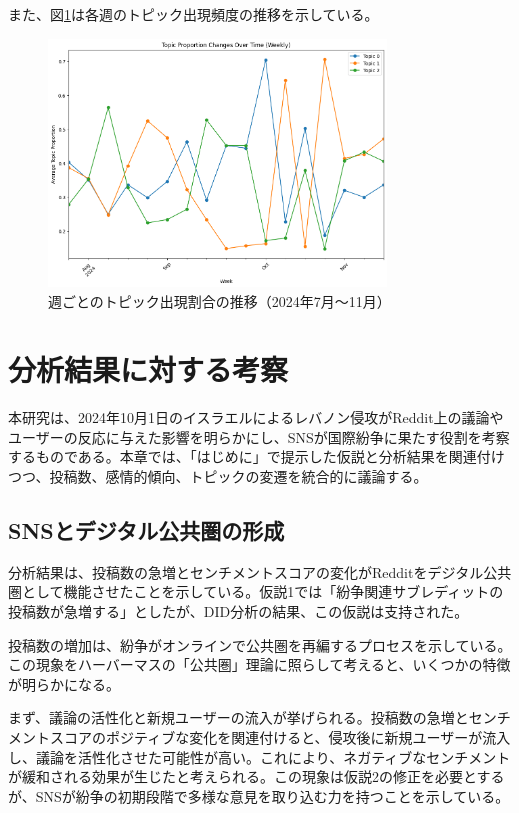 \documentclass[11pt, a4j]{jreport}
\begin{document}
    また、図\ref{fig:topic_trends}は各週のトピック出現頻度の推移を示している。

    \begin{figure}[H]
        \centering
        \includegraphics[width=0.8\textwidth]{topic_trends_plot.png}
        \caption{週ごとのトピック出現割合の推移（2024年7月～11月）}
        \label{fig:topic_trends}
    \end{figure}

    \chapter{分析結果に対する考察}

    本研究は、2024年10月1日のイスラエルによるレバノン侵攻がReddit上の議論やユーザーの反応に与えた影響を明らかにし、SNSが国際紛争に果たす役割を考察するものである。本章では、「はじめに」で提示した仮説と分析結果を関連付けつつ、投稿数、感情的傾向、トピックの変遷を統合的に議論する。

    \section{SNSとデジタル公共圏の形成}
    分析結果は、投稿数の急増とセンチメントスコアの変化がRedditをデジタル公共圏として機能させたことを示している。仮説1では「紛争関連サブレディットの投稿数が急増する」としたが、DID分析の結果、この仮説は支持された。

    投稿数の増加は、紛争がオンラインで公共圏を再編するプロセスを示している。この現象をハーバーマスの「公共圏」理論\citep{habermas1991structural}に照らして考えると、いくつかの特徴が明らかになる。

    まず、議論の活性化と新規ユーザーの流入が挙げられる。投稿数の急増とセンチメントスコアのポジティブな変化を関連付けると、侵攻後に新規ユーザーが流入し、議論を活性化させた可能性が高い。これにより、ネガティブなセンチメントが緩和される効果が生じたと考えられる。この現象は仮説2の修正を必要とするが、SNSが紛争の初期段階で多様な意見を取り込む力を持つことを示している。
    
\end{document}
